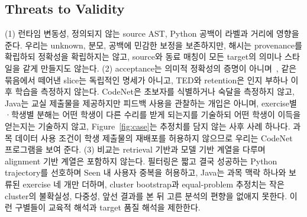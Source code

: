 \documentclass[10pt,conference]{IEEEtran}
\begin{document}
\subsection{Threats to Validity}
(1) 런타임 변동성, 정의되지 않는 source AST, Python 공백이 라벨과 거리에 영향을 준다. 우리는 unknown, 분모, 공백에 민감한 보정을 보존하지만, 해시는 provenance를 확립하되 정확성을 확립하지는 않고, source와 동료 매칭이 모든 target의 의미나 스타일을 같게 만들지도 않는다. (2) acceptance는 의미적 정확성의 증명이 아니며~\cite{smith2015cure}, 같은 묶음에서 떼어낸 slice는 독립적인 명세가 아니고, TED와 retention은 인지 부하나 이후 학습을 측정하지 않는다. CodeNet은 초보자를 식별하거나 숙달을 측정하지 않고, Java는 교실 제출물을 제공하지만 피드백 사용을 관찰하는 개입은 아니며, exercise별·학생별 분해는 어떤 학생이 다른 수리를 받게 되는지를 기술하되 어떤 학생이 이득을 얻는지는 기술하지 않고, Figure~\ref{fig:case}는 추정치를 담지 않는 사후 사례 하나다. 과목 데이터 사용 조건이 학생 제출물의 재배포를 허용하지 않으므로 우리는 CodeNet 프로그램을 보여 준다. (3) 비교는 retrieval 기반과 모델 기반 계열을 다루며 alignment 기반 계열은 포함하지 않는다. 필터링은 짧고 결국 성공하는 Python trajectory를 선호하며 Seen 내 사용자 중복을 허용하고, Java는 과목 맥락 하나와 보류된 exercise 네 개만 더하며, cluster bootstrap과 equal-problem 추정치는 작은 cluster의 불확실성, 다중성, 앞선 결과를 본 뒤 고른 분석의 편향을 없애지 못한다. 이런 구별들이 교육적 해석과 target 품질 해석을 제한한다.
\end{document}

